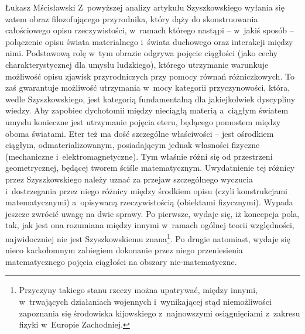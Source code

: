 \begin{artplenv}{Łukasz Mścisławski}
Z~powyższej analizy artykułu Szyszkowskiego wyłania się zatem obraz filozofującego przyrodnika, który dąży do skonstruowania całościowego opisu rzeczywistości, w~ramach którego nastąpi -- w~jakiś sposób -- połączenie opisu świata materialnego i~świata duchowego oraz interakcji między nimi. Podstawową rolę w~tym obrazie odgrywa pojęcie ciągłości (jako cechy charakterystycznej dla umysłu ludzkiego), którego utrzymanie warunkuje możliwość opisu zjawisk przyrodniczych przy pomocy równań różniczkowych. To zaś gwarantuje możliwość utrzymania w~mocy kategorii przyczynowości, która, wedle Szyszkowskiego, jest kategorią fundamentalną dla jakiejkolwiek dyscypliny wiedzy. Aby zapobiec dychotomii między nieciągłą materią a~ciągłym światem umysłu konieczne jest utrzymanie pojęcia eteru, będącego pomostem między oboma światami. Eter też ma dość szczególne właściwości -- jest ośrodkiem ciągłym, odmaterializowanym, posiadającym jednak własności fizyczne (mechaniczne i~elektromagnetyczne). Tym właśnie różni się od przestrzeni geometrycznej, będącej tworem ściśle matematycznym. Uwydatnienie tej różnicy przez Szyszkowskiego należy uznać za przejaw szczególnego wyczucia i~dostrzegania przez niego różnicy między środkiem opisu (czyli konstrukcjami matematycznymi) a~opisywaną rzeczywistością (obiektami fizycznymi). Wypada jeszcze zwrócić uwagę na dwie sprawy. Po pierwsze, wydaje się, iż koncepcja pola, tak, jak jest ona rozumiana między innymi w~ramach ogólnej teorii względności, najwidoczniej nie jest Szyszkowskiemu znana\footnote{Przyczyny takiego stanu rzeczy można upatrywać, między innymi, w~trwających działaniach wojennych i~wynikającej stąd niemożliwości zapoznania się środowiska kijowskiego z~najnowszymi osiągnięciami z~zakresu fizyki w~Europie Zachodniej.}. Po drugie natomiast, wydaje się nieco karkołomnym zabiegiem dokonanie przez niego przeniesienia matematycznego pojęcia ciągłości na obszary nie-matematyczne.


\end{artplenv}
